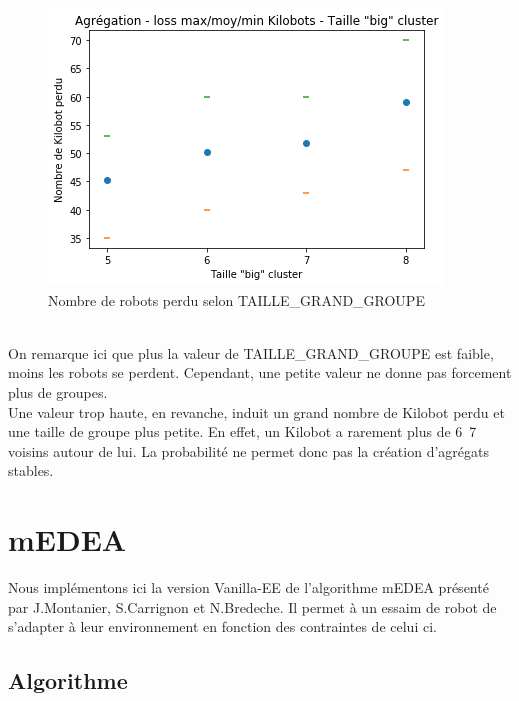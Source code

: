 \documentclass[a4paper]{article}
\begin{document}
\begin{figure}[h]
	\centering
	\begin{minipage}[c]{.46\linewidth}
		\centering
		\includegraphics[width=1.1\linewidth]{../../script_results/Agregation_loss_kilobot_big_cluster.png}
		\caption{Nombre de robots perdu selon TAILLE\_GRAND\_GROUPE}
	\end{minipage}
\end{figure}
\\On remarque ici que plus la valeur de TAILLE\_GRAND\_GROUPE est faible, moins les robots se perdent. Cependant, une petite valeur ne donne pas forcement plus de groupes.\\
Une valeur trop haute, en revanche, induit un grand nombre de Kilobot perdu et une taille de groupe plus petite. En effet, un Kilobot a rarement plus de 6~7 voisins autour de lui. La probabilité ne permet donc pas la création d'agrégats stables.
\newpage
\section{mEDEA}
Nous implémentons ici la version Vanilla-EE de l'algorithme mEDEA présenté par J.Montanier, S.Carrignon et N.Bredeche.  \cite{montanier_behavioral_2016} Il permet à un essaim de robot de s'adapter à leur environnement en fonction des contraintes de celui ci.
\subsection{Algorithme}
\end{document}
